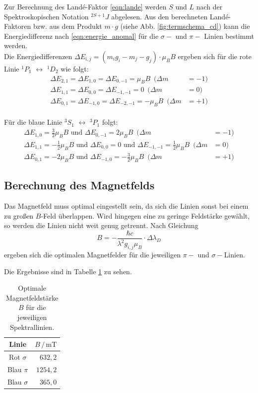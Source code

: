 Zur Berechnung des Landé-Faktor \eqref{eqn:lande} werden $S$ und $L$ nach der Spektroskopischen Notation $^{2S+1}J$ abgelesen.
Aus den berechneten Landé-Faktoren bzw. aus dem Produkt $m \cdot g$ (siehe Abb. \ref{fig:termschema_cd}) kann die Energiedifferenz nach \autoref{eqn:energie_anomal} für die $\sigma-$ und $\pi-$ Linien bestimmt werden.
\\
Die Energiedifferenzen $\Delta E_{i,j} = \left ( m_i g_i - m_j - g_j \right ) \cdot \mu_B B$ ergeben sich für die rote Linie $ ^1 P_1$ $\leftrightarrow$ $^1 D_2$ wie folgt:
\begin{align*}
    \Delta E_{2,1} =  \Delta E_{1,0} = \Delta E_{0,-1} = \mu_B B \,\,\, (\Delta m &= -1) \\
    \Delta E_{1,1} = \Delta E_{0,0} = \Delta E_{-1,-1} = 0 \,\,\, (\Delta m &= 0) \\
    \Delta E_{0,1} =  \Delta E_{-1,0} = \Delta E_{-2,-1} = - \mu_B B \,\,\, (\Delta m &= +1)
\end{align*}
\\
Für die blaue Linie $^3 S_1$ $\leftrightarrow$ $^3 P_1$ folgt:
\begin{align*}
    \Delta E_{1,0} = \frac{3}{2} \mu_B B \,\, \text{und} \,\, \Delta E_{0,-1} = 2 \mu_B B \,\,\, (\Delta m &= -1) \\
    \Delta E_{1,1} = - \frac{1}{2} \mu_B B \,\, \text{und} \,\, \Delta E_{0,0} = 0 \,\, \text{und} \,\, \Delta E_{-1,-1} = \frac{1}{2} \mu_B B \,\,\, (\Delta m &= 0) \\
    \Delta E_{0,1} = -2 \mu_B B \,\, \text{und} \,\, \Delta E_{-1,0} = -\frac{3}{2} \mu_B B \,\,\, (\Delta m &= +1)
\end{align*}
\FloatBarrier

\subsection{Berechnung des Magnetfelds}
Das Magnetfeld muss optimal eingestellt sein, da sich die Linien sonst bei einem zu großen $B$-Feld überlappen.
Wird hingegen eine zu geringe Feldstärke gewählt, so werden die Linien nicht weit genug getrennt.
Nach Gleichung
\begin{equation}
    B = - \frac{\hbar c}{\lambda^2 g_{i,j} \mu_B} \cdot \Delta \lambda_D
\end{equation}
ergeben sich die optimalen Magnetfelder für die jeweiligen $\pi-$ und $\sigma-$Linien.

Die Ergebnisse sind in Tabelle \ref{tab:magnetfelder} zu sehen.
\begin{table}
    \centering
    \caption{Optimale Magnetfeldstärke $B$ für die jeweiligen Spektrallinien.}
    \begin{tabular}{c r}
        \toprule
        Linie & $B \, / \, \si{\milli \tesla}$ \\
        \midrule
        Rot $\sigma$ & $632,2$ \\
        Blau $\pi$ & $1254,2$ \\
        Blau $\sigma$ & $365,0$ \\
        \bottomrule
    \end{tabular}
    \label{tab:magnetfelder}
\end{table}